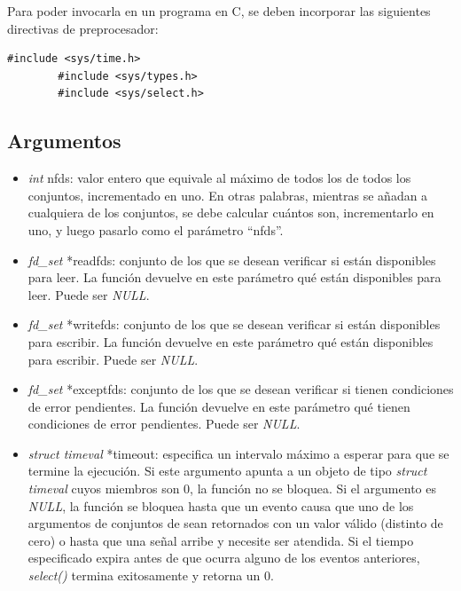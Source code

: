 \documentclass[12pt]{extarticle}
\begin{document}
    Para poder invocarla en un programa en C, se deben incorporar las siguientes directivas de preprocesador:

    \vspace*{10mm}
    \begin{lstlisting}[style=custom3c]
        #include <sys/time.h>
        #include <sys/types.h>
        #include <sys/select.h> 
    \end{lstlisting}

    \subsection*{Argumentos}
    \begin{itemize}
        \item \textit{int} nfds: valor entero que equivale al máximo de todos los \fd de todos los conjuntos, incrementado en uno. En otras palabras, mientras se añadan \fds a cualquiera de los conjuntos, se debe calcular cuántos son, incrementarlo en uno, y luego pasarlo como el parámetro ``nfds''.
        \item \textit{fd\_set} *readfds: conjunto de los \fds que se desean verificar si están disponibles para leer. La función devuelve en este parámetro qué \fds están disponibles para leer. Puede ser \textit{NULL}.
        \item \textit{fd\_set} *writefds: conjunto de los \fds que se desean verificar si están disponibles para escribir. La función devuelve en este parámetro qué \fds están disponibles para escribir. Puede ser \textit{NULL}.
        \item \textit{fd\_set} *exceptfds: conjunto de los \fds que se desean verificar si tienen condiciones de error pendientes. La función devuelve en este parámetro qué \fds tienen condiciones de error pendientes. Puede ser \textit{NULL}.
        \item \textit{struct timeval} *timeout: especifica un intervalo máximo a esperar para que se termine la ejecución. Si este argumento apunta a un objeto de tipo \textit{struct timeval} cuyos miembros son 0, la función no se bloquea. Si el argumento es \textit{NULL}, la función se bloquea hasta que un evento causa que uno de los argumentos de conjuntos de \fds sean retornados con un valor válido (distinto de cero) o hasta que una señal arribe y necesite ser atendida. Si el tiempo especificado expira antes de que ocurra alguno de los eventos anteriores, \textit{select()} termina exitosamente y retorna un 0.
    \end{itemize}
\end{document}
